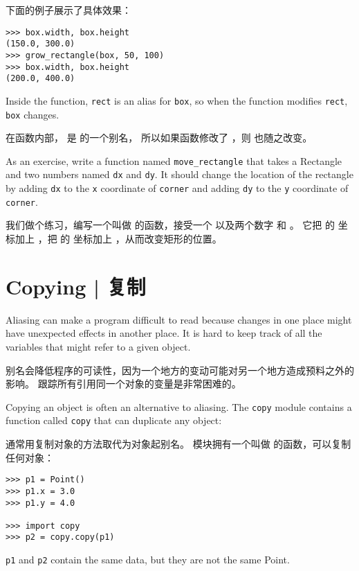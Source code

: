 下面的例子展示了具体效果：

\begin{lstlisting}
>>> box.width, box.height
(150.0, 300.0)
>>> grow_rectangle(box, 50, 100)
>>> box.width, box.height
(200.0, 400.0)
\end{lstlisting}
%
Inside the function, {\tt rect} is an
alias for {\tt box}, so when the function modifies {\tt rect},
{\tt box} changes.

在函数内部，  是  的一个别名，
所以如果函数修改了  ，则  也随之改变。

As an exercise, write a function named \verb"move_rectangle" that takes
a Rectangle and two numbers named {\tt dx} and {\tt dy}.  It
should change the location of the rectangle by adding {\tt dx}
to the {\tt x} coordinate of {\tt corner} and adding {\tt dy}
to the {\tt y} coordinate of {\tt corner}.

我们做个练习，编写一个叫做  的函数，接受一个  以及两个数字  和 。  它把  的  坐标加上 ，把  的  坐标加上  ，从而改变矩形的位置。

\section{Copying  |  复制}
\label{copying}

Aliasing can make a program difficult to read because changes
in one place might have unexpected effects in another place.
It is hard to keep track of all the variables that might refer
to a given object.

别名会降低程序的可读性，因为一个地方的变动可能对另一个地方造成预料之外的影响。
跟踪所有引用同一个对象的变量是非常困难的。
  
  

Copying an object is often an alternative to aliasing.
The {\tt copy} module contains a function called {\tt copy} that
can duplicate any object:

通常用复制对象的方法取代为对象起别名。
 模块拥有一个叫做  的函数，可以复制任何对象：

\begin{lstlisting}
>>> p1 = Point()
>>> p1.x = 3.0
>>> p1.y = 4.0

>>> import copy
>>> p2 = copy.copy(p1)
\end{lstlisting}

%
{\tt p1} and {\tt p2} contain the same data, but they are
not the same Point.

